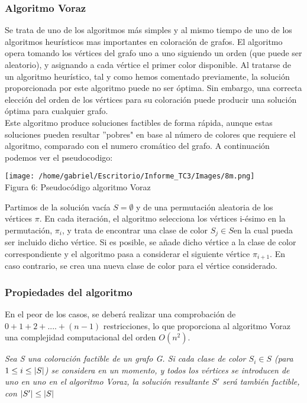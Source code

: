 \documentclass[12pt]{report}
\begin{document}
\subsubsection{Algoritmo Voraz}
Se trata de uno de los algoritmos más simples y al mismo tiempo de uno de los algoritmos heurísticos mas importantes en coloración de grafos. El algoritmo opera tomando los vértices del grafo uno a uno siguiendo un orden (que puede ser aleatorio), y asignando a cada vértice el primer color disponible. Al tratarse de un algoritmo heurístico, tal y como hemos comentado previamente, la solución proporcionada por este algoritmo puede no ser óptima. Sin embargo, una correcta elección del orden de los vértices para su coloración puede producir una solución óptima para cualquier grafo.\\
Este algoritmo produce soluciones factibles de forma rápida, aunque estas soluciones pueden resultar ''pobres" en base al número de colores que requiere el algoritmo, comparado con el numero cromático del grafo. A continuación podemos ver el pseudocodigo:\\
\begin{center}
\texttt{[image: /home/gabriel/Escritorio/Informe\_TC3/Images/8m.png]}\\
Figura 6: Pseudocódigo algoritmo Voraz
\end{center}
Partimos de la solución vacía $ S = \emptyset $ y de una permutación aleatoria de los vértices $\pi$. En cada iteración, el algoritmo selecciona los vértices \textsf{i-}ésimo en la permutación, $\pi_i$, y trata de encontrar una clase de color $S_j \in S$en la cual pueda ser incluido dicho vértice. Si es posible, se añade dicho vértice a la clase de color correspondiente y el algoritmo pasa a considerar el siguiente vértice $\pi_{i+1}$. En caso contrario, se crea una nueva clase de color para el vértice considerado.
\subsubsection{Propiedades del algoritmo}
En el peor de los casos, se deberá realizar una comprobación de $0+1+2+....+(n-1)$ restricciones, lo que proporciona al algoritmo Voraz una complejidad computacional del orden $O(n^2)$.
\begin{tm}
\textsl{Sea S una coloración factible de un grafo G. Si cada clase de color $S_i \in S$ (para $1 \leq i \leq \lvert S\rvert$) se considera en un momento, y todos los vértices se introducen de uno en uno en el algoritmo Voraz, la solución resultante $S'$ será también factible, con $\lvert S'\rvert \leq \lvert S\rvert $}
\end{tm}
\end{document}
